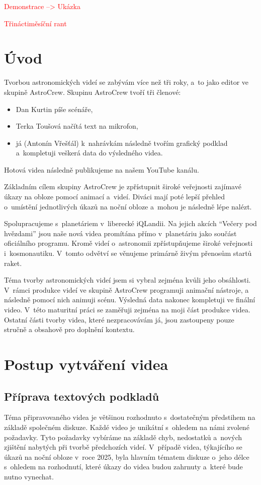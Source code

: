 \documentclass[12pt,a4paper,titlepage]{article}
\newcommand{\todo}[1]{\textcolor{red}{#1}}
\begin{document}
\todo{Demonstrace --> Ukázka}

\todo{Třináctiměsíční rant}

\section{Úvod}
Tvorbou astronomických videí se zabývám více než tři roky, a~to jako editor ve skupině AstroCrew. Skupinu AstroCrew tvoří tři členové:

\begin{itemize}
	\item Dan Kurtin píše scénáře,
	\item Terka Toušová načítá text na mikrofon,
	\item já (Antonín Vřešťál) k~nahrávkám následně tvořím grafický podklad a~kompletuji veškerá data do výsledného videa.
\end{itemize}
Hotová videa následně publikujeme na našem YouTube kanálu. 

Základním cílem skupiny AstroCrew je zpřístupnit široké veřejnosti zajímavé úkazy na obloze pomocí animací a~videí. Diváci mají poté lepší přehled o~umístění jednotlivých úkazů na noční obloze a~mohou je následně lépe nalézt.

Spolupracujeme s~planetáriem v~liberecké iQLandii. Na jejich akcích \enquote{Večery pod hvězdami} jsou naše nová videa promítána přímo v~planetáriu jako součást oficiálního programu. Kromě videí o~astronomii zpřístupňujeme široké veřejnosti i~kosmonautiku. V~tomto odvětví se věnujeme primárně živým přenosům startů raket.

Téma tvorby astronomických videí jsem si vybral zejména kvůli jeho obsáhlosti. V~rámci produkce videí ve skupině AstroCrew programuji animační nástroje, a následně pomocí nich animuji scénu. Výsledná data nakonec kompletuji ve finální video. V~této maturitní práci se zaměřuji zejména na moji část produkce videa. Ostatní části tvorby videa, které nezpracovávám já, jsou zastoupeny pouze stručně a obsahově pro doplnění kontextu. 
\section{Postup vytváření videa}\label{makingof}
\subsection{Příprava textových podkladů}\label{makingof:text-prep}
Téma připravovaného videa je většinou rozhodnuto s~dostatečným předstihem na základě společném diskuze. Každé video je unikátní s~ohledem na námi zvolené požadavky. Tyto požadavky vybíráme na základě chyb, nedostatků a~nových zjištění nabytých při tvorbě předchozích videí. V~případě videa, týkajícího se úkazů na noční obloze v~roce 2025, byla hlavním tématem diskuze o~jeho délce s~ohledem na rozhodnutí, které úkazy do videa budou zahrnuty a~které bude nutno vynechat.
\end{document}
